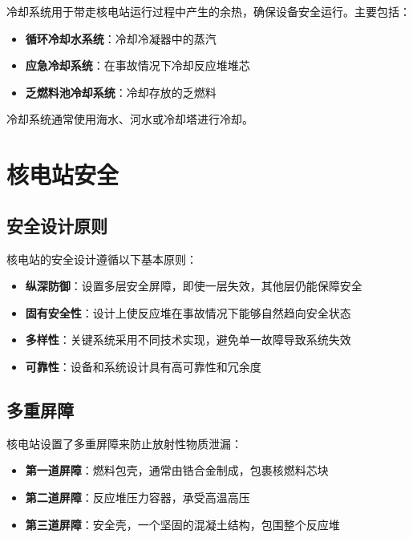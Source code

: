 \documentclass[12pt,UTF8]{ctexbook}
\begin{document}
冷却系统用于带走核电站运行过程中产生的余热，确保设备安全运行。主要包括：

\begin{itemize}[leftmargin=2cm]
    \item \textbf{循环冷却水系统}：冷却冷凝器中的蒸汽
    \item \textbf{应急冷却系统}：在事故情况下冷却反应堆堆芯
    \item \textbf{乏燃料池冷却系统}：冷却存放的乏燃料
\end{itemize}

冷却系统通常使用海水、河水或冷却塔进行冷却。

\chapter{核电站安全}

\section{安全设计原则}

核电站的安全设计遵循以下基本原则：

\begin{itemize}[leftmargin=2cm]
    \item \textbf{纵深防御}：设置多层安全屏障，即使一层失效，其他层仍能保障安全
    \item \textbf{固有安全性}：设计上使反应堆在事故情况下能够自然趋向安全状态
    \item \textbf{多样性}：关键系统采用不同技术实现，避免单一故障导致系统失效
    \item \textbf{可靠性}：设备和系统设计具有高可靠性和冗余度
\end{itemize}

\section{多重屏障}

核电站设置了多重屏障来防止放射性物质泄漏：

\begin{itemize}[leftmargin=2cm]
    \item \textbf{第一道屏障}：燃料包壳，通常由锆合金制成，包裹核燃料芯块
    \item \textbf{第二道屏障}：反应堆压力容器，承受高温高压
    \item \textbf{第三道屏障}：安全壳，一个坚固的混凝土结构，包围整个反应堆
\end{itemize}
\end{document}
